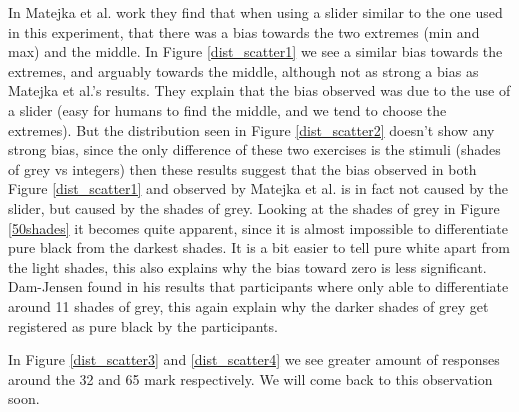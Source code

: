 In Matejka et al.\cite{grey} work they find that when using a slider similar to the one used in this experiment, that there was a bias towards the two extremes (min and max) and the middle. In Figure \ref{dist_scatter1} we see a similar bias towards the extremes, and arguably towards the middle, although not as strong a bias as Matejka et al.'s results. They explain that the bias observed was due to the use of a slider (easy for humans to find the middle, and we tend to choose the extremes). But the distribution seen in Figure \ref{dist_scatter2} doesn't show any strong bias, since the only difference of these two exercises is the stimuli (shades of grey vs integers) then these results suggest that the bias observed in both Figure \ref{dist_scatter1} and observed by Matejka et al. is in fact not caused by the slider, but caused by the shades of grey. Looking at the shades of grey in Figure \ref{50shades} it becomes quite apparent, since it is almost impossible to differentiate pure black from the darkest shades. It is a bit easier to tell pure white apart from the light shades, this also explains why the bias toward zero is less significant. Dam-Jensen\cite{dam} found in his results that participants where only able to differentiate around 11 shades of grey, this again explain why the darker shades of grey get registered as pure black by the participants.

In Figure \ref{dist_scatter3} and \ref{dist_scatter4} we see greater amount of responses around the 32 and 65 mark respectively. We will come back to this observation soon.

